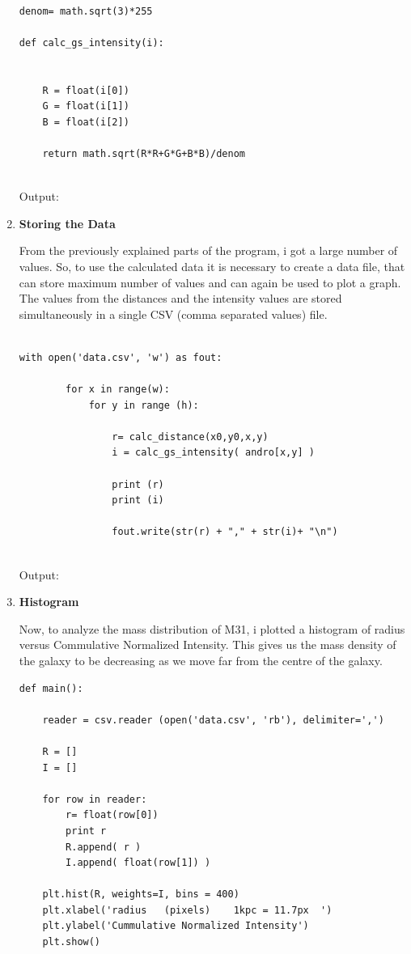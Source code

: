 \begin{enumerate}
\begin{verbatim}

denom= math.sqrt(3)*255

def calc_gs_intensity(i):


    R = float(i[0])
    G = float(i[1])
    B = float(i[2])

    return math.sqrt(R*R+G*G+B*B)/denom


\end{verbatim}

Output:

\item \textbf{Storing the Data}

From the previously explained parts of the program, i got a large number of values. So, to use the calculated data it is necessary to create a data file, that can store maximum number of values and can again be used to plot a graph. The values from the distances and the intensity values are stored simultaneously in a single CSV (comma separated values) file.
\begin{verbatim}

with open('data.csv', 'w') as fout:

        for x in range(w):
            for y in range (h):

                r= calc_distance(x0,y0,x,y)
                i = calc_gs_intensity( andro[x,y] )

                print (r)
                print (i)

                fout.write(str(r) + "," + str(i)+ "\n")


\end{verbatim}
Output:

\item \textbf{Histogram}

Now, to analyze the mass distribution of M31, i plotted a histogram of radius versus Commulative Normalized Intensity. This gives us the mass density of the galaxy to be decreasing as we move far from the centre of the galaxy.
\begin{verbatim}
def main():

    reader = csv.reader (open('data.csv', 'rb'), delimiter=',')

    R = []
    I = []

    for row in reader:
        r= float(row[0])
        print r
        R.append( r )
        I.append( float(row[1]) )

    plt.hist(R, weights=I, bins = 400)
    plt.xlabel('radius   (pixels)    1kpc = 11.7px  ')
    plt.ylabel('Cummulative Normalized Intensity')
    plt.show()


\end{verbatim}
\end{enumerate}
